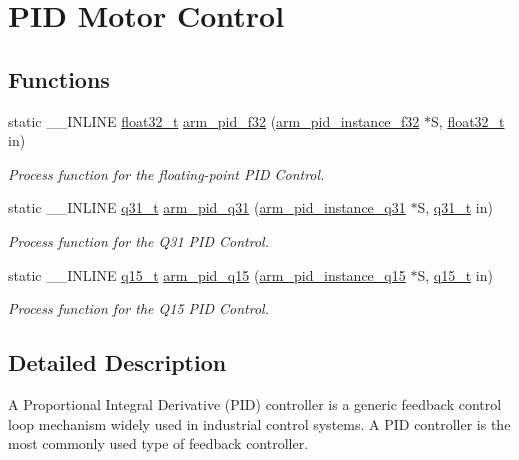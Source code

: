 \hypertarget{group___p_i_d}{}\section{P\+ID Motor Control}
\label{group___p_i_d}
\subsection*{Functions}
\begin{DoxyCompactItemize}
\item 
static \+\_\+\+\_\+\+I\+N\+L\+I\+NE \hyperlink{arm__math_8h_a4611b605e45ab401f02cab15c5e38715}{float32\+\_\+t} \hyperlink{group___p_i_d_gac5c79ed46abf2d72b8cf41fa6c708bda}{arm\+\_\+pid\+\_\+f32} (\hyperlink{structarm__pid__instance__f32}{arm\+\_\+pid\+\_\+instance\+\_\+f32} $\ast$S, \hyperlink{arm__math_8h_a4611b605e45ab401f02cab15c5e38715}{float32\+\_\+t} in)
\begin{DoxyCompactList}\small\item\em Process function for the floating-\/point P\+ID Control. \end{DoxyCompactList}\item 
static \+\_\+\+\_\+\+I\+N\+L\+I\+NE \hyperlink{arm__math_8h_adc89a3547f5324b7b3b95adec3806bc0}{q31\+\_\+t} \hyperlink{group___p_i_d_ga5f6f941e7ae981728dd3a662f8f4ecd7}{arm\+\_\+pid\+\_\+q31} (\hyperlink{structarm__pid__instance__q31}{arm\+\_\+pid\+\_\+instance\+\_\+q31} $\ast$S, \hyperlink{arm__math_8h_adc89a3547f5324b7b3b95adec3806bc0}{q31\+\_\+t} in)
\begin{DoxyCompactList}\small\item\em Process function for the Q31 P\+ID Control. \end{DoxyCompactList}\item 
static \+\_\+\+\_\+\+I\+N\+L\+I\+NE \hyperlink{arm__math_8h_ab5a8fb21a5b3b983d5f54f31614052ea}{q15\+\_\+t} \hyperlink{group___p_i_d_ga084f646bbb20d55f225c3efafcf7fc1f}{arm\+\_\+pid\+\_\+q15} (\hyperlink{structarm__pid__instance__q15}{arm\+\_\+pid\+\_\+instance\+\_\+q15} $\ast$S, \hyperlink{arm__math_8h_ab5a8fb21a5b3b983d5f54f31614052ea}{q15\+\_\+t} in)
\begin{DoxyCompactList}\small\item\em Process function for the Q15 P\+ID Control. \end{DoxyCompactList}\end{DoxyCompactItemize}


\subsection{Detailed Description}
A Proportional Integral Derivative (P\+ID) controller is a generic feedback control loop mechanism widely used in industrial control systems. A P\+ID controller is the most commonly used type of feedback controller.

